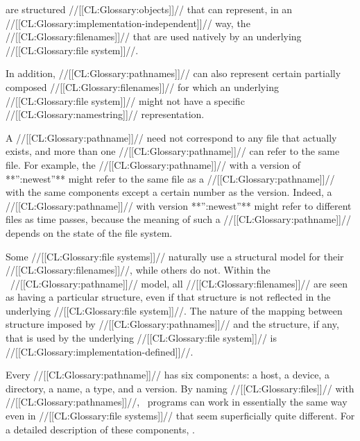 






 are structured //[[CL:Glossary:objects]]// that can represent,
in an //[[CL:Glossary:implementation-independent]]// way,
the //[[CL:Glossary:filenames]]// that are used natively by an underlying //[[CL:Glossary:file system]]//.

In addition, //[[CL:Glossary:pathnames]]// can also represent certain partially composed 
//[[CL:Glossary:filenames]]// for which an underlying //[[CL:Glossary:file system]]// 
might not have a specific //[[CL:Glossary:namestring]]// representation.







A //[[CL:Glossary:pathname]]// need not correspond to any file that actually exists, 
and more than one //[[CL:Glossary:pathname]]// can refer to the same file.
For example, the //[[CL:Glossary:pathname]]// with a version of **'':newest''** 
might refer to the same file as a //[[CL:Glossary:pathname]]// 
with the same components except a certain number as the version.
Indeed, a //[[CL:Glossary:pathname]]// with version **'':newest''** might refer to
different files as time passes, because the meaning of such a //[[CL:Glossary:pathname]]//
depends on the state of the file system.  

Some //[[CL:Glossary:file systems]]// naturally use a structural model for their
//[[CL:Glossary:filenames]]//, while others do not.  Within the \clisp\ //[[CL:Glossary:pathname]]// model, 
all //[[CL:Glossary:filenames]]// are seen as having a particular structure,
even if that structure is not reflected in the underlying //[[CL:Glossary:file system]]//.
The nature of the mapping between structure imposed by //[[CL:Glossary:pathnames]]//
and the structure, if any, that is used by the underlying //[[CL:Glossary:file system]]//
is //[[CL:Glossary:implementation-defined]]//.









Every //[[CL:Glossary:pathname]]// has six components:
     a host,
     a device,
     a directory,
     a name,
     a type,
 and a version.
By naming //[[CL:Glossary:files]]// with //[[CL:Glossary:pathnames]]//, 
\clisp\ programs can work in essentially the same way even in //[[CL:Glossary:file systems]]//
that seem superficially quite different.
For a detailed description of these components, \seesection\PathnameComponents.

